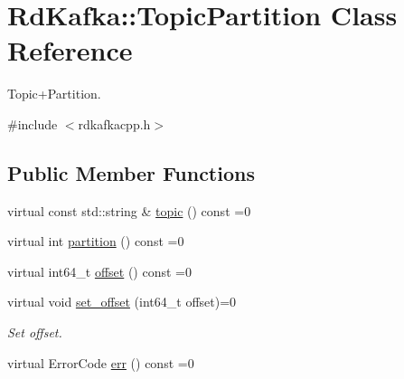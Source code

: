 \hypertarget{classRdKafka_1_1TopicPartition}{
\section{RdKafka::TopicPartition Class Reference}
\label{classRdKafka_1_1TopicPartition}
}


Topic+Partition.  


{\ttfamily \#include $<$rdkafkacpp.h$>$}\subsection*{Public Member Functions}
\begin{DoxyCompactItemize}
\item 
virtual const std::string \& \hyperlink{classRdKafka_1_1TopicPartition_a1e1d34726a70a1109f67202f74d1e6b4}{topic} () const =0
\item 
virtual int \hyperlink{classRdKafka_1_1TopicPartition_aac977298931c0488e0c759c896aa7418}{partition} () const =0
\item 
virtual int64\_\-t \hyperlink{classRdKafka_1_1TopicPartition_adaa8701081082dd24e8897d1f2b3f75d}{offset} () const =0
\item 
\hypertarget{classRdKafka_1_1TopicPartition_a8dfaa301f6ee2b079ba5ba27d2df8c26}{
virtual void \hyperlink{classRdKafka_1_1TopicPartition_a8dfaa301f6ee2b079ba5ba27d2df8c26}{set\_\-offset} (int64\_\-t offset)=0}
\label{classRdKafka_1_1TopicPartition_a8dfaa301f6ee2b079ba5ba27d2df8c26}

\begin{DoxyCompactList}\small\item\em Set offset. \item\end{DoxyCompactList}\item 
virtual ErrorCode \hyperlink{classRdKafka_1_1TopicPartition_adf4cd4ca1ed51f1829fddd475b96adee}{err} () const =0
\end{DoxyCompactItemize}
